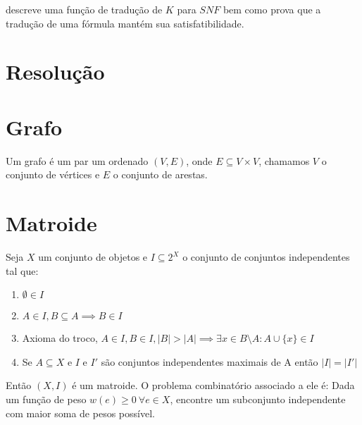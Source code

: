 \cite{nalontocl} descreve uma função de tradução de $K$ para $SNF$ bem como prova que a tradução de uma fórmula mantém sua satisfatibilidade.

\section{Resolução}


\section{Grafo}
Um grafo é um par um ordenado $(V, E)$, onde $E \subseteq V\times V$, chamamos $V$ o conjunto de vértices e $E$ o conjunto de arestas.

\section{Matroide}
Seja $X$ um conjunto de objetos e $I \subseteq 2^X$ o conjunto de conjuntos independentes tal que:
\begin{enumerate}
	\item $\emptyset \in I$
	\item $A \in I, B \subseteq A \implies B \in I$
	\item Axioma do troco, $A \in I, B \in I, |B| > |A| \implies \exists x \in B \setminus A : A \cup \{x\} \in I$
	\item Se $A \subseteq X$ e $I$ e $I'$ são conjuntos independentes maximais de A então $|I| = |I'|$
\end{enumerate}
Então $(X, I)$ é um matroide. O problema combinatório associado a ele é: Dada um função de peso $w(e) \geq 0 ~\forall e \in X$, encontre um subconjunto independente com maior soma de pesos possível.
